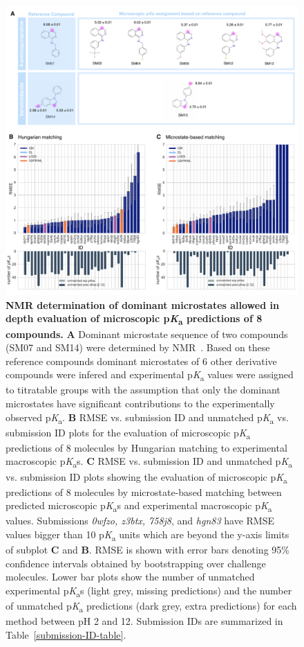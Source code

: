 \documentclass[9pt,lineno,final]{elife}
\newcommand{\pKa}{p\textit{K}\textsubscript{a}}
\begin{document}
\begin{figure}
\centering
\includegraphics[width=1.0\linewidth]{figures/typeI_8_mol_matching_comparison.pdf}
\caption{{\bf NMR determination of dominant microstates allowed in depth evaluation of microscopic \pKa{} predictions of 8 compounds.} 
{\bf A} Dominant microstate sequence of two compounds (SM07 and SM14) were determined by NMR~\cite{Isik:2018:J.Comput.AidedMol.Des.}. Based on these reference compounds dominant microstates of 6 other derivative compounds were infered and experimental \pKa{} values were assigned to titratable groups with the assumption that only the dominant microstates have significant contributions to the experimentally observed \pKa{}.
{\bf B} RMSE vs. submission ID and unmatched \pKa{} vs. submission ID plots for the evaluation of microscopic \pKa{} predictions of 8 molecules by Hungarian matching to experimental macroscopic \pKa{}s. {\bf C} RMSE vs. submission ID and unmatched \pKa{} vs. submission ID plots showing the evaluation of microscopic \pKa{} predictions of 8 molecules by microstate-based matching between predicted microscopic \pKa{}s and experimental macroscopic \pKa{} values. Submissions \textit{0wfzo, z3btx, 758j8}, and \textit{hgn83} have RMSE values bigger than 10 \pKa{} units which are beyond the y-axis limits of subplot {\bf C} and {\bf B}.
RMSE is shown with error bars denoting 95\% confidence intervals obtained by bootstrapping over challenge molecules. Lower bar plots show the number of unmatched experimental \pKa{}s (light grey, missing predictions) and the number of unmatched \pKa{} predictions (dark grey, extra predictions) for each method between pH 2 and 12. Submission IDs are summarized in Table~\ref{submission-ID-table}. 
}
\label{fig:typeI-matching-algorithm-comparison}
\end{figure}
\end{document}
